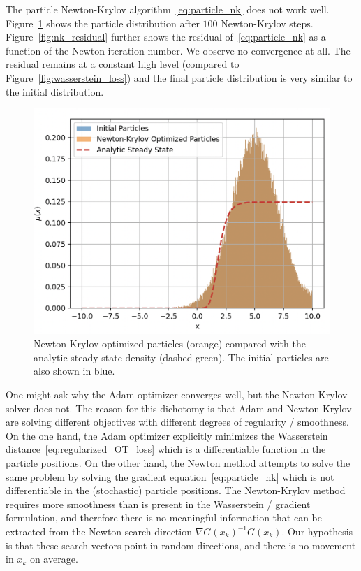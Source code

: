 \documentclass{article}
\begin{document}
The particle Newton-Krylov algorithm~\eqref{eq:particle_nk} does not work well. Figure~\ref{fig:nk_particles} shows the particle distribution after $100$ Newton-Krylov steps. Figure~\ref{fig:nk_residual} further shows the residual of~\eqref{eq:particle_nk} as a function of the Newton iteration number. We observe no convergence at all. The residual remains at a constant high level (compared to Figure~\ref{fig:wasserstein_loss}) and the final particle distribution is very similar to the initial distribution.

\begin{figure}[ht]
    \centering
    \includegraphics[width=0.7\linewidth]{figures/Simple Chemotaxis NK Particles.png}
    \caption{Newton-Krylov-optimized particles (orange) compared with the analytic steady-state density (dashed green). The initial particles are also shown in blue.}
    \label{fig:nk_particles}
\end{figure}

One might ask why the Adam optimizer converges well, but the Newton-Krylov solver does not. The reason for this dichotomy is that Adam and Newton-Krylov are solving different objectives with different degrees of regularity / smoothness. On the one hand, the Adam optimizer explicitly minimizes the Wasserstein distance~\eqref{eq:regularized_OT_loss} which is a differentiable function in the particle positions. On the other hand, the Newton method attempts to solve the same problem by solving the gradient equation~\eqref{eq:particle_nk} which is not differentiable in the (stochastic) particle positions. The Newton-Krylov method requires more smoothness than is present in the Wasserstein / gradient formulation, and therefore there is no meaningful information that can be extracted from the Newton search direction $\nabla G(x_k)^{-1} G(x_k)$. Our hypothesis is that these search vectors point in random directions, and there is no movement in $x_k$ on average.
\end{document}
